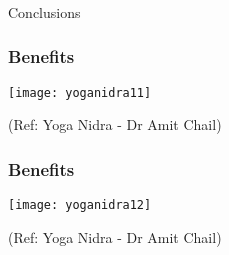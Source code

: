 \begin{frame}[fragile]\frametitle{}
\begin{center}
{\Large Conclusions}
\end{center}
\end{frame}

\begin{frame}[fragile]\frametitle{Benefits}
      \begin{center}
        \texttt{[image: yoganidra11]}

		{\tiny (Ref: Yoga Nidra - Dr Amit Chail)}		
        \end{center}

\end{frame}

\begin{frame}[fragile]\frametitle{Benefits}
      \begin{center}
        \texttt{[image: yoganidra12]}

		{\tiny (Ref: Yoga Nidra - Dr Amit Chail)}		
        \end{center}

\end{frame}

